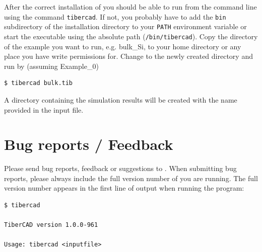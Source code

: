 After the correct installation of \TiberCAD{} you should be able to run \TiberCAD{} from the command line using the command \verb+tibercad+.
If not, you probably have to add the \verb+bin+ subdirectory of the \TiberCAD{} installation directory to your \verb+PATH+ environment variable or start the \TiberCAD{} executable using the absolute path (\instpath\verb+/bin/tibercad+).
Copy the directory of the example you want to run, e.g. bulk\_Si, to your home
directory or any place you have write permissions for. Change to the newly
created directory and run \TiberCAD{} by (assuming Example\_0)
\begin{verbatim}
$ tibercad bulk.tib
\end{verbatim}
A directory containing the simulation results will be created with the name provided in the input file.


\section*{Bug reports / Feedback}

Please send bug reports, feedback or suggestions to .
When submitting bug reports, please always include the full version number of \TiberCAD{} you are running.
The full version number appears in the first line of output when running the program:
\begin{verbatim}
$ tibercad

TiberCAD version 1.0.0-961

Usage: tibercad <inputfile>

\end{verbatim}
